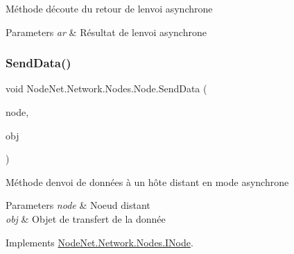 Méthode d\textquotesingle{}écoute du retour de l\textquotesingle{}envoi asynchrone 


\begin{DoxyParams}{Parameters}
{\em ar} & Résultat de l\textquotesingle{}envoi asynchrone\\
\hline
\end{DoxyParams}
\mbox{\label{class_node_net_1_1_network_1_1_nodes_1_1_node_a208a1c10ae68109762205f3cbcb9665a}} 
\subsubsection{\texorpdfstring{Send\+Data()}{SendData()}}
{\footnotesize\ttfamily void Node\+Net.\+Network.\+Nodes.\+Node.\+Send\+Data (\begin{DoxyParamCaption}\item[{\hyperlink{class_node_net_1_1_network_1_1_nodes_1_1_node}{Node}}]{node,  }\item[{\hyperlink{class_node_net_1_1_data_1_1_data_input}{Data\+Input}}]{obj }\end{DoxyParamCaption})}



Méthode d\textquotesingle{}envoi de données à un hôte distant en mode asynchrone 


\begin{DoxyParams}{Parameters}
{\em node} & Noeud distant\\
\hline
{\em obj} & Objet de transfert de la donnée\\
\hline
\end{DoxyParams}


Implements \hyperlink{interface_node_net_1_1_network_1_1_nodes_1_1_i_node_ad0fd6197c2be78c4b17d3d02bb9f9a0b}{Node\+Net.\+Network.\+Nodes.\+I\+Node}.

\mbox{\label{class_node_net_1_1_network_1_1_nodes_1_1_node_a7238e906549594e340d72f99e4575660}} 
